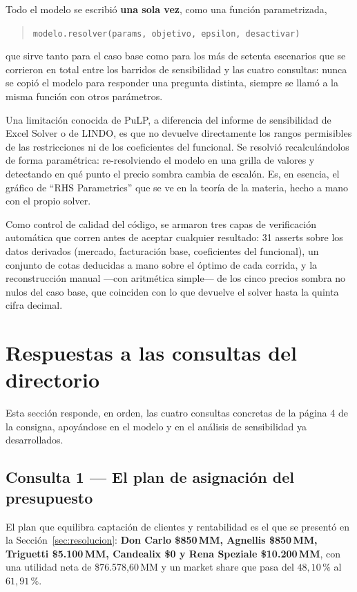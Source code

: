 \documentclass[10pt,a4paper]{article}
\begin{document}
Todo el modelo se escribió \textbf{una sola vez}, como una función
parametrizada,
\begin{quote}
\centering\small\texttt{modelo.resolver(params, objetivo, epsilon, desactivar)}
\end{quote}
que sirve tanto para el caso base como para los más de setenta escenarios que
se corrieron en total entre los barridos de sensibilidad y las cuatro
consultas: nunca se copió el modelo para responder una pregunta distinta,
siempre se llamó a la misma función con otros parámetros.

Una limitación conocida de PuLP, a diferencia del informe de sensibilidad de
Excel Solver o de LINDO, es que no devuelve directamente los rangos
permisibles de las restricciones ni de los coeficientes del funcional. Se
resolvió recalculándolos de forma paramétrica: re-resolviendo el modelo en una
grilla de valores y detectando en qué punto el precio sombra cambia de
escalón. Es, en esencia, el gráfico de ``RHS Parametrics'' que se ve en la
teoría de la materia, hecho a mano con el propio solver.

Como control de calidad del código, se armaron tres capas de verificación
automática que corren antes de aceptar cualquier resultado: 31 asserts sobre
los datos derivados (mercado, facturación base, coeficientes del funcional),
un conjunto de cotas deducidas a mano sobre el óptimo de cada corrida, y la
reconstrucción manual —con aritmética simple— de los cinco precios sombra no
nulos del caso base, que coinciden con lo que devuelve el solver hasta la
quinta cifra decimal.

\section{Respuestas a las consultas del directorio}

Esta sección responde, en orden, las cuatro consultas concretas de la página 4
de la consigna, apoyándose en el modelo y en el análisis de sensibilidad ya
desarrollados.

\subsection{Consulta 1 — El plan de asignación del presupuesto}

El plan que equilibra captación de clientes y rentabilidad es el que se
presentó en la Sección~\ref{sec:resolucion}: \textbf{Don Carlo \$850\,MM,
Agnellis \$850\,MM, Triguetti \$5.100\,MM, Candealix \$0 y Rena Speziale
\$10.200\,MM}, con una utilidad neta de \$76.578,60\,MM y un market share que
pasa del $48{,}10\,\%$ al $61{,}91\,\%$.
\end{document}
